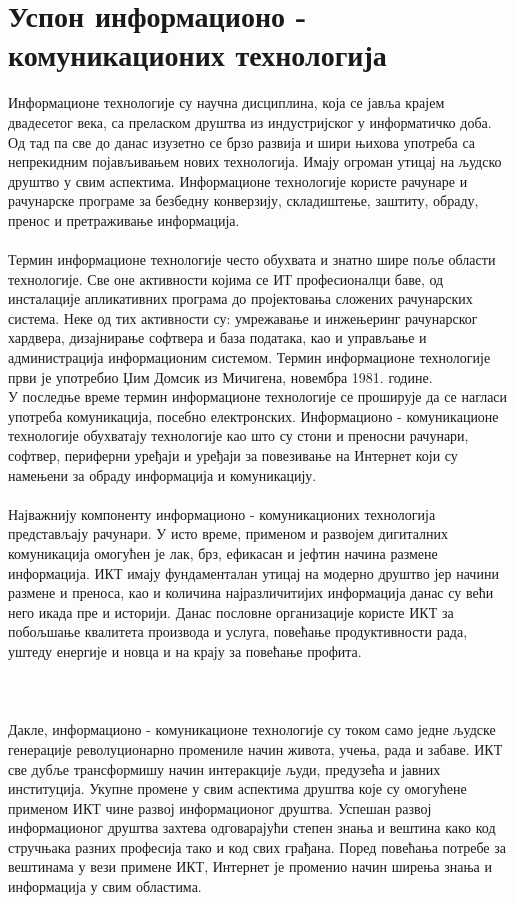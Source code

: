 \documentclass{article}
\begin{document}
\section{Успон информационо - комуникационих технологија}
Информационе технологије су научна дисциплина, која се јавља крајем двадесетог века, са преласком друштва из индустријског у информатичко доба. Од тад па све до данас изузетно се брзо развија и шири њихова употреба са непрекидним појављивањем нових технологија. Имају огроман утицај на људско друштво у свим аспектима. Информационе технологије користе рачунаре и рачунарске програме за безбедну конверзију, складиштење, заштиту, обраду, пренос и претраживање информација.
\\\\
Термин информационе технологије често обухвата и знатно шире поље области технологије. Све оне активности којима се ИТ професионалци баве, од инсталације апликативних програма до пројектовања сложених рачунарских система. Неке од тих активности су: умрежавање и инжењеринг рачунарског хардвера, дизајнирање софтвера и база података, као и управљање и администрација информационим системом. Термин информационе технологије први је употребио Џим Домсик из Мичигена, новембра 1981. године. \\
У последње време термин информационе технологије се проширује да се нагласи употреба комуникација, посебно електронских. Информационо - комуникационе технологије обухватају технологије као што су стони и преносни рачунари, софтвер, периферни уређаји и уређаји за повезивање на Интернет који су намењени за обраду информација и комуникацију.\\\\
Најважнију компоненту информационо - комуникационих технологија представљају рачунари. У исто време, применом и развојем дигиталних комуникација омогућен је лак, брз, ефикасан и јефтин начина размене информација. ИКТ имају фундаменталан утицај на модерно друштво јер начини размене и преноса, као и количина најразличитијих информација данас су већи него икада пре и историји. Данас пословне организације користе ИКТ за побољшање квалитета производа и услуга, повећање продуктивности рада, уштеду енергије и новца и на крају за повећање профита. \\\\\\\\
Дакле, информационо - комуникационе технологије су током само једне људске генерације револуционарно промениле начин живота, учења, рада и забаве. ИКТ све дубље трансформишу начин интеракције људи, предузећа и јавних институција. Укупне промене у свим аспектима друштва које су омогућене применом ИКТ чине развој информационог друштва. Успешан развој информационог друштва захтева одговарајући степен знања и вештина како код стручњака разних професија тако и код свих грађана. Поред повећања потребе за вештинама у вези примене ИКТ, Интернет је променио начин ширења знања и информација у свим областима.
\end{document}

